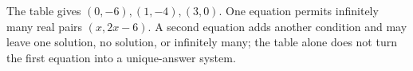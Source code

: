 The table gives $(0,-6),(1,-4),(3,0)$. One equation permits infinitely many real pairs $(x,2x-6)$. A second equation adds another condition and may leave one solution, no solution, or infinitely many; the table alone does not turn the first equation into a unique-answer system.
